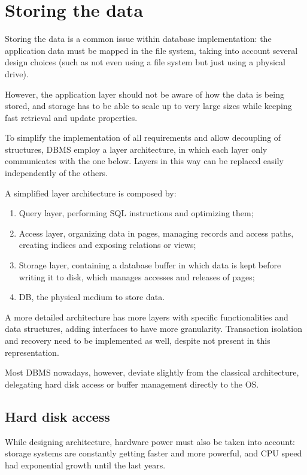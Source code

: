 \section{Storing the data}
Storing the data is a common issue within database implementation: the application data must be mapped in the file system, taking into account several design choices (such as not even using a file system but just using a physical drive).

However, the application layer should not be aware of how the data is being stored, and storage has to be able to scale up to very large sizes while keeping fast retrieval and update properties. 

To simplify the implementation of all requirements and allow decoupling of structures, DBMS employ a layer architecture, in which each layer only communicates with the one below. Layers in this way can be replaced easily independently of the others.

A simplified layer architecture is composed by:
\begin{enumerate}
	\item Query layer, performing SQL instructions and optimizing them;
	\item Access layer, organizing data in pages, managing records and access paths, creating indices and exposing relations or views;
	\item Storage layer, containing a database buffer in which data is kept before writing it to disk, which manages accesses and releases of pages;
	\item DB, the physical medium to store data.
\end{enumerate}

A more detailed architecture has more layers with specific functionalities and data structures, adding interfaces to have more granularity. Transaction isolation and recovery need to be implemented as well, despite not present in this representation.

Most DBMS nowadays, however, deviate slightly from the classical architecture, delegating hard disk access or buffer management directly to the OS. 

\subsection{Hard disk access}
While designing architecture, hardware power must also be taken into account: storage systems are constantly getting faster and more powerful, and CPU speed had exponential growth until the last years. 

